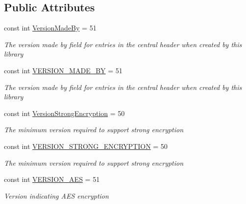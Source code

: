 \subsection*{Public Attributes}
\begin{DoxyCompactItemize}
\item 
const int \hyperlink{class_i_c_sharp_code_1_1_sharp_zip_lib_1_1_zip_1_1_zip_constants_a0bb8d53d8b597060b48bff864459797d}{Version\+Made\+By} = 51
\begin{DoxyCompactList}\small\item\em The version made by field for entries in the central header when created by this library \end{DoxyCompactList}\item 
const int \hyperlink{class_i_c_sharp_code_1_1_sharp_zip_lib_1_1_zip_1_1_zip_constants_aada6f519a2ef4bbc62397220e2c33a3d}{V\+E\+R\+S\+I\+O\+N\+\_\+\+M\+A\+D\+E\+\_\+\+BY} = 51
\begin{DoxyCompactList}\small\item\em The version made by field for entries in the central header when created by this library \end{DoxyCompactList}\item 
const int \hyperlink{class_i_c_sharp_code_1_1_sharp_zip_lib_1_1_zip_1_1_zip_constants_a1956e7c5a694713692b24b7cfc0ad9d9}{Version\+Strong\+Encryption} = 50
\begin{DoxyCompactList}\small\item\em The minimum version required to support strong encryption \end{DoxyCompactList}\item 
const int \hyperlink{class_i_c_sharp_code_1_1_sharp_zip_lib_1_1_zip_1_1_zip_constants_a505c83ae4c7619abd006e7b27ec04716}{V\+E\+R\+S\+I\+O\+N\+\_\+\+S\+T\+R\+O\+N\+G\+\_\+\+E\+N\+C\+R\+Y\+P\+T\+I\+ON} = 50
\begin{DoxyCompactList}\small\item\em The minimum version required to support strong encryption \end{DoxyCompactList}\item 
const int \hyperlink{class_i_c_sharp_code_1_1_sharp_zip_lib_1_1_zip_1_1_zip_constants_abce3f5a5879874fa5578dd4f7741704c}{V\+E\+R\+S\+I\+O\+N\+\_\+\+A\+ES} = 51
\begin{DoxyCompactList}\small\item\em Version indicating A\+ES encryption \end{DoxyCompactList}\item 

\end{DoxyCompactItemize}

